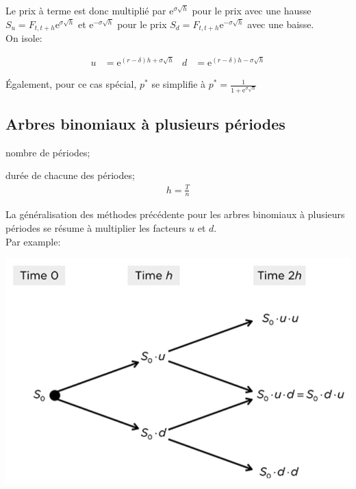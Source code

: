 \documentclass[10pt, french]{article}
\begin{document}
\begin{multicols*}{2}
Le prix à terme est donc multiplié par $\textrm{e}^{\sigma \sqrt{h}}$ pour le prix avec une hausse $S_{u} = F_{t, t + h}\textrm{e}^{\sigma \sqrt{h}}$ et $\textrm{e}^{-\sigma \sqrt{h}}$ pour le prix $S_{d} = F_{t, t + h}\textrm{e}^{-\sigma \sqrt{h}}$ avec une baisse.\\

On isole:
\begin{rappel}{}
	\begin{align*}
	u	&=	\textrm{e}^{(r - \delta)h + \sigma \sqrt{h}}	&
	d	&=	\textrm{e}^{(r - \delta)h - \sigma \sqrt{h}}
	\end{align*}
\end{rappel}

Également, pour ce cas spécial, $p^{*}$ se simplifie à $p^{*}	=	\frac{1}{1 + \textrm{e}^{\sigma \sqrt{h}}}$

\subsection{Arbres binomiaux à plusieurs périodes}

\begin{distributions}[Notation]
\begin{description}[leftmargin = *]
	\item[$n$]	nombre de périodes;
	\item[$h$]	durée de chacune des périodes;
		\begin{align*}
		h	=	\frac{T}{n}
		\end{align*}
\end{description}
\end{distributions}

La généralisation des méthodes précédente pour les arbres binomiaux à plusieurs périodes se résume à multiplier les facteurs $u$ et $d$. \\
Par example:
\begin{center}
	\includegraphics[scale=0.33]{../../src/ACT-2011/mult-per-bin-tree.png}
\end{center}


\end{multicols*}
\end{document}
